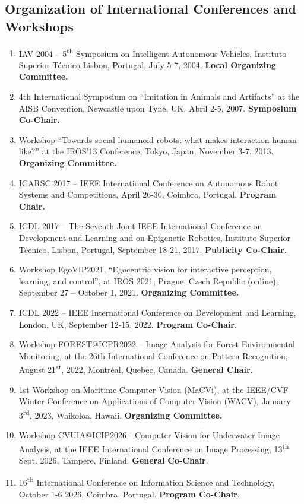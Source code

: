\subsection{Organization of International Conferences and
Workshops}\label{organization-of-international-conferences-and-workshops}

\begin{enumerate}
\def\labelenumi{\arabic{enumi}.}
\item
  IAV 2004 -- 5\textsuperscript{th} Symposium on Intelligent Autonomous
  Vehicles, Instituto Superior Técnico Lisbon, Portugal, July 5-7, 2004.
  \textbf{Local Organizing Committee.}
\item
  4th International Symposium on ``Imitation in Animals and Artifacts''
  at the AISB Convention, Newcastle upon Tyne, UK,
  Abril 2-5, 2007. \textbf{Symposium Co-Chair.}
\item
  Workshop ``Towards social humanoid robots: what makes interaction
  human-like?'' at the IROS'13 Conference, Tokyo, Japan, November 3-7,
  2013. \textbf{Organizing Committee.}
\item
  ICARSC 2017 -- IEEE International Conference on Autonomous Robot
  Systems and Competitions, April 26-30, Coimbra, Portugal.
  \textbf{Program Chair.}
\item
  ICDL 2017 -- The Seventh Joint IEEE International Conference on
  Development and Learning and on Epigenetic Robotics, Instituto
  Superior Técnico, Lisbon, Portugal, September 18-21, 2017.
  \textbf{Publicity Co-Chair.}
\item
  Workshop EgoVIP2021, ``Egocentric vision for interactive perception,
  learning, and control'', at IROS 2021, Prague, Czech Republic
  (online), September 27 -- October 1, 2021. \textbf{Organizing
  Committee.}
\item
  ICDL 2022 -- IEEE International Conference on Development and
  Learning, London, UK, September 12-15, 2022. \textbf{Program
  Co-Chair}.
\item
  Workshop FOREST@ICPR2022 -- Image Analysis for Forest Environmental
  Monitoring, at the 26th International Conference on Pattern
  Recognition, August 21\textsuperscript{st}, 2022, Montréal, Quebec,
  Canada. \textbf{General Chair}.
\item
  1st Workshop on Maritime Computer Vision (MaCVi), at the IEEE/CVF
  Winter Conference on Applications of Computer Vision (WACV), January
  3\textsuperscript{rd}, 2023, Waikoloa, Hawaii. \textbf{Organizing
  Committee.}
\item
  Workshop CVUIA@ICIP2026 - Computer Vision for Underwater Image
  Analysis, at the IEEE International Conference on Image Processing,
  13\textsuperscript{th} Sept. 2026, Tampere, Finland. \textbf{General}
  \textbf{Co-Chair}.
\item
  16\textsuperscript{th} International Conference on Information Science
  and Technology, October 1-6 2026, Coimbra, Portugal. \textbf{Program
  Co-Chair}.
\end{enumerate}

